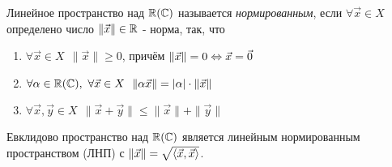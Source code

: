 \begin{definition}
	Линейное пространство над $\mathbb{R}(\mathbb{C})$ называется \textit{нормированным}, если $\forall \vec{x} \in X$ определено число $\|\vec{x}\| \in \mathbb{R}$ - норма, так, что
	\begin{enumerate}
		\item $\forall \vec{x} \in X\ \ \|\vec{x}\| \ge 0$, причём $\|\vec{x}\| = 0 \Leftrightarrow \vec{x} = \vec{0}$
		
		\item $\forall \alpha \in \mathbb{R}(\mathbb{C}),\ \forall \vec{x} \in X\ \ \|\alpha \vec{x}\| = |\alpha| \cdot \|\vec{x}\|$
		
		\item $\forall \vec{x}, \vec{y} \in X\ \ \|\vec{x} + \vec{y}\| \le \|\vec{x}\| + \|\vec{y}\|$
	\end{enumerate}
\end{definition}

\begin{theorem} 
	Евклидово пространство над $\mathbb{R}(\mathbb{C})$ является линейным нормированным пространством (ЛНП) с $\|\vec{x}\| = \sqrt{\langle\vec{x}, \vec{x}\rangle}$.
\end{theorem}

